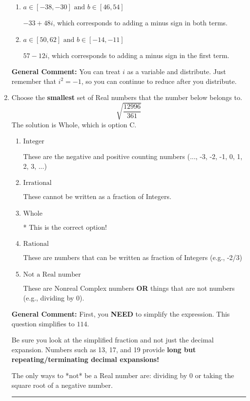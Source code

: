 \documentclass{extbook}[14pt]
\newcommand{\litem}[1]{\item #1

\rule{\textwidth}{0.4pt}}
\begin{document}
\begin{enumerate}
{\begin{enumerate}[label=\Alph*.]
 $12 + 45 i$, which corresponds to just multiplying the real terms to get the real part of the solution and the coefficients in the complex terms to get the complex part.
\item \( a \in [-38, -30] \text{ and } b \in [46, 54] \)

 $-33 + 48 i$, which corresponds to adding a minus sign in both terms.
\item \( a \in [50, 62] \text{ and } b \in [-14, -11] \)

 $57 - 12 i$, which corresponds to adding a minus sign in the first term.
\end{enumerate}

\textbf{General Comment:} You can treat $i$ as a variable and distribute. Just remember that $i^2=-1$, so you can continue to reduce after you distribute.
}
\litem{
Choose the \textbf{smallest} set of Real numbers that the number below belongs to.
\[ \sqrt{\frac{12996}{361}} \]The solution is \( \text{Whole} \), which is option C.\begin{enumerate}[label=\Alph*.]
\item \( \text{Integer} \)

These are the negative and positive counting numbers (..., -3, -2, -1, 0, 1, 2, 3, ...)
\item \( \text{Irrational} \)

These cannot be written as a fraction of Integers.
\item \( \text{Whole} \)

* This is the correct option!
\item \( \text{Rational} \)

These are numbers that can be written as fraction of Integers (e.g., -2/3)
\item \( \text{Not a Real number} \)

These are Nonreal Complex numbers \textbf{OR} things that are not numbers (e.g., dividing by 0).
\end{enumerate}

\textbf{General Comment:} First, you \textbf{NEED} to simplify the expression. This question simplifies to $114$. 
 
 Be sure you look at the simplified fraction and not just the decimal expansion. Numbers such as 13, 17, and 19 provide \textbf{long but repeating/terminating decimal expansions!} 
 
 The only ways to *not* be a Real number are: dividing by 0 or taking the square root of a negative number. 
 
}
\end{enumerate}
\end{document}
